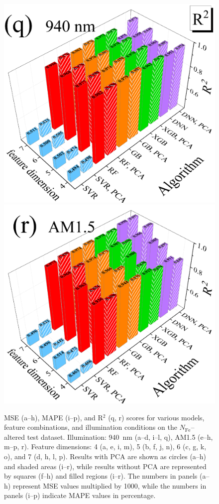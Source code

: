 \documentclass[a4paper,fleqn]{cas-sc}
\begin{document}
\begin{figure}
     \includegraphics[width=0.25\linewidth]{Fig7q.png}
     \includegraphics[width=0.25\linewidth]{Fig7r.png}
	  \caption{MSE (a--h), MAPE (i--p), and R$^{2}$ (q, r) scores for various models, feature combinations, and illumination conditions on the $N_\mathrm{Fe}$--altered test dataset. Illumination: 940~nm (a--d, i--l, q), AM1.5 (e--h, m--p, r). Feature dimensions: 4 (a, e, i, m), 5 (b, f, j, n), 6 (c, g, k, o), and 7 (d, h, l, p). Results with PCA are shown as circles (a--h) and shaded areas (i--r), while results without PCA are represented by squares (f--h) and filled regions (i--r). The numbers in panels (a--h) represent MSE values multiplied by 1000, while the numbers in panels (i--p) indicate MAPE values in percentage.
}\label{fig7}
\end{figure}
\end{document}
